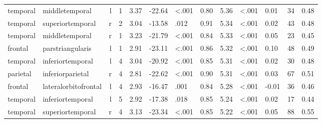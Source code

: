\documentclass{article}
\begin{document}
\begin{longtable}{llrR{1.3cm}R{1cm}R{1.3cm}R{1cm}R{1cm}R{1.3cm}R{1cm}R{1.8cm}R{1.3cm}R{1.8cm}}
  temporal &            middletemporal &    l &         1 &                  3.37 &           -22.64 &      \textless.001 &                               0.80 &                          5.36 &                   \textless.001 &   0.01 &     34 &      0.48 \\
  temporal &          superiortemporal &    r &         2 &                  3.04 &           -13.58 &               .012 &                               0.91 &                          5.34 &                   \textless.001 &   0.02 &     43 &      0.48 \\
  temporal &            middletemporal &    r &         1 &                  3.23 &           -21.79 &      \textless.001 &                               0.84 &                          5.33 &                   \textless.001 &   0.05 &     23 &      0.45 \\
   frontal &          parstriangularis &    l &         1 &                  2.91 &           -23.11 &      \textless.001 &                               0.86 &                          5.32 &                   \textless.001 &   0.10 &     48 &      0.49 \\
  temporal &          inferiortemporal &    l &         4 &                  3.04 &           -20.92 &      \textless.001 &                               0.85 &                          5.31 &                   \textless.001 &   0.02 &     30 &      0.48 \\
  parietal &          inferiorparietal &    r &         4 &                  2.81 &           -22.62 &      \textless.001 &                               0.90 &                          5.31 &                   \textless.001 &   0.03 &     67 &      0.51 \\
   frontal &      lateralorbitofrontal &    l &         4 &                  2.93 &           -16.47 &               .001 &                               0.84 &                          5.28 &                   \textless.001 &  -0.01 &     36 &      0.46 \\
  temporal &          inferiortemporal &    l &         5 &                  2.92 &           -17.38 &               .018 &                               0.85 &                          5.24 &                   \textless.001 &   0.02 &     17 &      0.44 \\
  temporal &          superiortemporal &    r &         4 &                  3.13 &           -23.34 &      \textless.001 &                               0.85 &                          5.22 &                   \textless.001 &   0.05 &     88 &      0.55 \\

\end{longtable}
\end{document}
